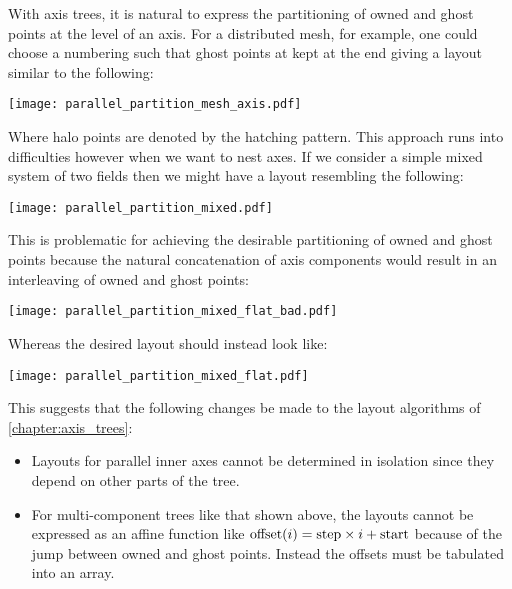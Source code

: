 \documentclass[thesis]{subfiles}
\begin{document}


With axis trees, it is natural to express the partitioning of owned and ghost points at the level of an axis.
For a distributed mesh, for example, one could choose a numbering such that ghost points at kept at the end giving a layout similar to the following:

\begin{center}
  \texttt{[image: parallel\_partition\_mesh\_axis.pdf]}
\end{center}

Where halo points are denoted by the hatching pattern.
This approach runs into difficulties however when we want to nest axes.
If we consider a simple mixed system of two fields then we might have a layout resembling the following:

\begin{center}
  \texttt{[image: parallel\_partition\_mixed.pdf]}
\end{center}


This is problematic for achieving the desirable partitioning of owned and ghost points because the natural concatenation of axis components would result in an interleaving of owned and ghost points:

\begin{center}
  \texttt{[image: parallel\_partition\_mixed\_flat\_bad.pdf]}
\end{center}

Whereas the desired layout should instead look like:

\begin{center}
  \texttt{[image: parallel\_partition\_mixed\_flat.pdf]}
\end{center}

This suggests that the following changes be made to the layout algorithms of \cref{chapter:axis_trees}:

\begin{itemize}
  \item
    Layouts for parallel inner axes cannot be determined in isolation since they depend on other parts of the tree.
  \item
    For multi-component trees like that shown above, the layouts cannot be expressed as an affine function like $\textnormal{offset}(i) = \textnormal{step} \times i + \textnormal{start}$ because of the jump between owned and ghost points.
    Instead the offsets must be tabulated into an array.
\end{itemize}
\end{document}
